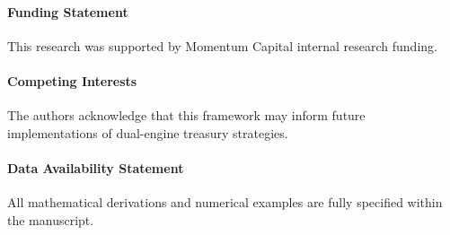 \documentclass[
  journal=medium,
  manuscript=article-type,
  year=2025,
  volume=1,
]{cup-journal}
\theoremstyle{definition}
\begin{document}
\paragraph{Funding Statement}
This research was supported by Momentum Capital internal research funding.

\paragraph{Competing Interests}
The authors acknowledge that this framework may inform future implementations of dual-engine treasury strategies.

\paragraph{Data Availability Statement}
All mathematical derivations and numerical examples are fully specified within the manuscript.

\printendnotes
\end{document}
